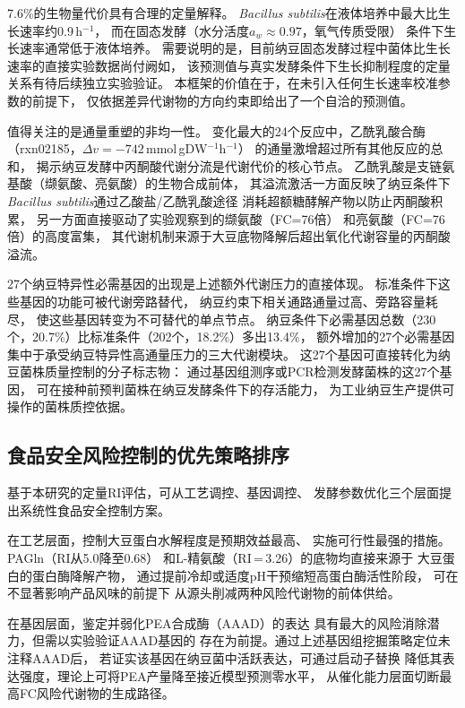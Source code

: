 \documentclass[10pt, a4paper, twocolumn]{ctexart}
\newcommand{\bs}{\textit{Bacillus subtilis}}
\newcommand{\mmolg}{mmol\,gDW$^{-1}$h$^{-1}$}
\begin{document}
7.6\%的生物量代价具有合理的定量解释。
\bs{}在液体培养中最大比生长速率约0.9\,h$^{-1}$，
而在固态发酵（水分活度$a_w\approx0.97$，氧气传质受限）
条件下生长速率通常低于液体培养。
需要说明的是，目前纳豆固态发酵过程中菌体比生长速率的直接实验数据尚付阙如，
该预测值与真实发酵条件下生长抑制程度的定量关系有待后续独立实验验证。
本框架的价值在于，在未引入任何生长速率校准参数的前提下，
仅依据差异代谢物的方向约束即给出了一个自洽的预测值。

值得关注的是通量重塑的非均一性。
变化最大的24个反应中，乙酰乳酸合酶（rxn02185，$\Delta v=-742$\,\mmolg{}）
的通量激增超过所有其他反应的总和，
揭示纳豆发酵中丙酮酸代谢分流是代谢代价的核心节点。
乙酰乳酸是支链氨基酸（缬氨酸、亮氨酸）的生物合成前体，
其溢流激活一方面反映了纳豆条件下\bs{}通过乙酸盐/乙酰乳酸途径
消耗超额糖酵解产物以防止丙酮酸积累，
另一方面直接驱动了实验观察到的缬氨酸（FC=76倍）
和亮氨酸（FC=76倍）的高度富集，
其代谢机制来源于大豆底物降解后超出氧化代谢容量的丙酮酸溢流。

27个纳豆特异性必需基因的出现是上述额外代谢压力的直接体现。
标准条件下这些基因的功能可被代谢旁路替代，
纳豆约束下相关通路通量过高、旁路容量耗尽，
使这些基因转变为不可替代的单点节点。
纳豆条件下必需基因总数（230个，20.7\%）比标准条件（202个，18.2\%）多出13.4\%，
额外增加的27个必需基因集中于承受纳豆特异性高通量压力的三大代谢模块。
这27个基因可直接转化为纳豆菌株质量控制的分子标志物：
通过基因组测序或PCR检测发酵菌株的这27个基因，
可在接种前预判菌株在纳豆发酵条件下的存活能力，
为工业纳豆生产提供可操作的菌株质控依据。

\subsection{食品安全风险控制的优先策略排序}

基于本研究的定量RI评估，可从工艺调控、基因调控、
发酵参数优化三个层面提出系统性食品安全控制方案。

在工艺层面，控制大豆蛋白水解程度是预期效益最高、
实施可行性最强的措施。PAGln（RI从5.0降至0.68）
和L-精氨酸（RI\,=\,3.26）的底物均直接来源于
大豆蛋白的蛋白酶降解产物，
通过提前冷却或适度pH干预缩短高蛋白酶活性阶段，
可在不显著影响产品风味的前提下
从源头削减两种风险代谢物的前体供给。

在基因层面，鉴定并弱化PEA合成酶（AAAD）的表达
具有最大的风险消除潜力，但需以实验验证AAAD基因的
存在为前提。通过上述基因组挖掘策略定位未注释AAAD后，
若证实该基因在纳豆菌中活跃表达，可通过启动子替换
降低其表达强度，理论上可将PEA产量降至接近模型预测零水平，
从催化能力层面切断最高FC风险代谢物的生成路径。
\end{document}
